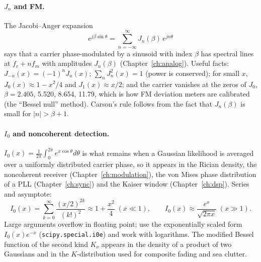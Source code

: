 \paragraph{$J_n$ and FM.} The Jacobi--Anger expansion
\begin{equation}
e^{j\beta\sin\theta}=\sum_{n=-\infty}^{\infty}J_n(\beta)\,e^{jn\theta}
\label{eq:appA:jacobi}
\end{equation}
says that a carrier phase-modulated by a sinusoid with index $\beta$ has spectral lines at
$f_c+nf_m$ with amplitudes $J_n(\beta)$ (Chapter~\ref{ch:analog}). Useful facts:
$J_{-n}(x)=(-1)^nJ_n(x)$; $\sum_nJ_n^2(x)=1$ (power is conserved); for small $x$,
$J_0(x)\approx1-x^2/4$ and $J_1(x)\approx x/2$; and the carrier vanishes at the zeros of $J_0$,
$\beta=2.405$, 5.520, 8.654, 11.79, which is how FM deviation meters are calibrated (the
``Bessel null'' method). Carson's rule follows from the fact that $J_n(\beta)$ is small for
$|n|>\beta+1$.

\paragraph{$I_0$ and noncoherent detection.} $I_0(x)=\frac1{2\pi}\int_0^{2\pi}e^{x\cos\theta}d\theta$
is what remains when a Gaussian likelihood is averaged over a uniformly distributed carrier
phase, so it appears in the Rician density, the noncoherent receiver (Chapter~\ref{ch:modulation}),
the von Mises phase distribution of a PLL (Chapter~\ref{ch:sync}) and the Kaiser window
(Chapter~\ref{ch:dsp}). Series and asymptote:
\begin{equation}
I_0(x)=\sum_{k=0}^{\infty}\frac{(x/2)^{2k}}{(k!)^2}\approx1+\frac{x^2}{4}\;(x\ll1),\qquad
I_0(x)\approx\frac{e^x}{\sqrt{2\pi x}}\;(x\gg1).
\label{eq:appA:i0}
\end{equation}
Large arguments overflow in floating point; use the exponentially scaled form
$I_0(x)e^{-x}$ (\texttt{scipy.special.i0e}) and work with logarithms. The modified Bessel function
of the second kind $K_\nu$ appears in the density of a product of two Gaussians and in the
$K$-distribution used for composite fading and sea clutter.


